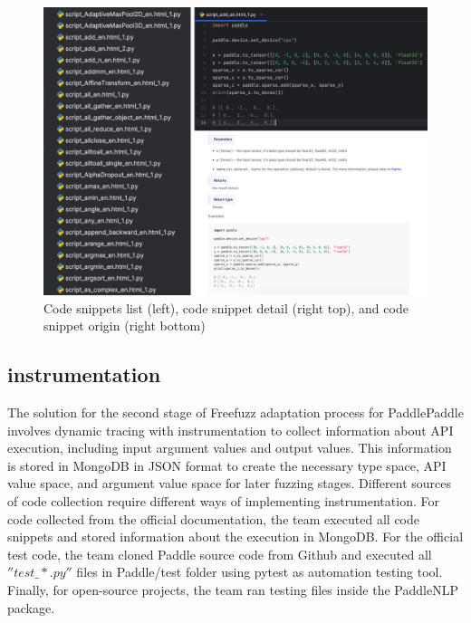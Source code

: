 \documentclass[sigconf]{acmart}
\begin{document}
    \begin{figure}[h]
      \centering
      \includegraphics[width=\linewidth]{2.png}
      \caption{Code snippets list (left), code snippet detail (right top), and code snippet origin (right bottom)}
    \end{figure}  
    
  \subsection{instrumentation}
  The solution for the second stage of Freefuzz adaptation process for PaddlePaddle involves dynamic tracing with instrumentation to collect information about API execution, including input argument values and output values. 
  This information is stored in MongoDB in JSON format to create the necessary type space, API value space, and argument value space for later fuzzing stages. 
  Different sources of code collection require different ways of implementing instrumentation. For code collected from the official documentation, the team executed all code snippets and stored information about the execution in MongoDB. 
  For the official test code, the team cloned Paddle source code from Github and executed all $''test\_*.py''$ files in Paddle/test folder using pytest as automation testing tool. 
  Finally, for open-source projects, the team ran testing files inside the PaddleNLP package.
\end{document}
